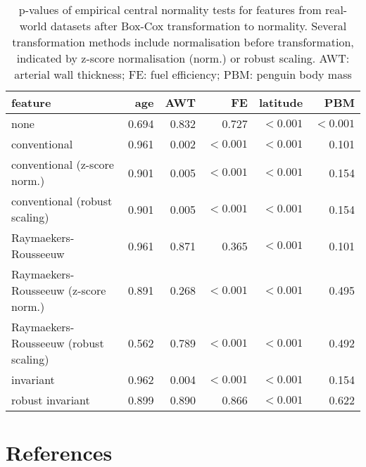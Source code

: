 \documentclass[
  a4paper,
]{article}
\begin{document}
\begin{table}
\begin{center}
\caption{
p-values of empirical central normality tests for features from real-world datasets after Box-Cox transformation to normality.
Several transformation methods include normalisation before transformation, indicated by z-score normalisation (norm.) or robust scaling. 
AWT: arterial wall thickness; FE: fuel efficiency; PBM: penguin body mass}
\label{tab:experimental-results-appendix-p-value-bc}
\begin{tabular}{l | r r r r r}

\toprule
feature & age & AWT & FE & latitude & PBM \\

\midrule

none                                  & 0.694 & 0.832 & 0.727     & $< 0.001$ & $< 0.001$ \\
conventional                          & 0.961 & 0.002 & $< 0.001$ & $< 0.001$ & 0.101 \\
conventional (z-score norm.)          & 0.901 & 0.005 & $< 0.001$ & $< 0.001$ & 0.154 \\
conventional (robust scaling)         & 0.901 & 0.005 & $< 0.001$ & $< 0.001$ & 0.154 \\
Raymaekers-Rousseeuw                  & 0.961 & 0.871 & 0.365     & $< 0.001$ & 0.101 \\
Raymaekers-Rousseeuw (z-score norm.)  & 0.891 & 0.268 & $< 0.001$ & $< 0.001$ & 0.495 \\
Raymaekers-Rousseeuw (robust scaling) & 0.562 & 0.789 & $< 0.001$ & $< 0.001$ & 0.492 \\
invariant                             & 0.962 & 0.004 & $< 0.001$ & $< 0.001$ & 0.154 \\
robust invariant                      & 0.899 & 0.890 & 0.866     & $< 0.001$ & 0.622 \\

\bottomrule
\end{tabular}
\end{center}
\end{table}

\FloatBarrier

\section*{References}\label{references}
\end{document}
